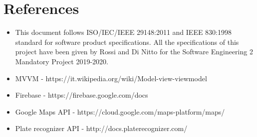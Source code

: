 \documentclass[../RASD.tex]{subfiles}
\begin{document}
\chapter{References}\label{ch:references}
    \begin{itemize}
        \item This document follows ISO/IEC/IEEE 29148:2011 and IEEE 830:1998 standard for software product specifications.
        All the specifications of this project have been given by Rossi and Di Nitto for the Software Engineering 2 Mandatory Project 2019-2020.
        \item MVVM - https://it.wikipedia.org/wiki/Model-view-viewmodel
        \item Firebase - https://firebase.google.com/docs
        \item Google Maps API - https://cloud.google.com/maps-platform/maps/
        \item Plate recognizer API - http://docs.platerecognizer.com/
    \end{itemize}
\end{document}
